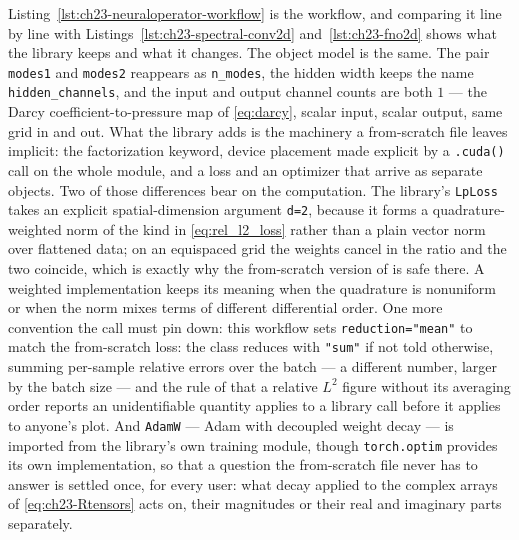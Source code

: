 Listing~\ref{lst:ch23-neuraloperator-workflow} is the workflow, and comparing it
line by line with Listings~\ref{lst:ch23-spectral-conv2d}
and~\ref{lst:ch23-fno2d} shows what the library keeps and what it changes. The
object model is the same. The pair \texttt{modes1} and \texttt{modes2} reappears
as \texttt{n\_modes}, the hidden width keeps the name \texttt{hidden\_channels},
and the input and output channel counts are both $1$ --- the Darcy
coefficient-to-pressure map of \eqref{eq:darcy}, scalar input, scalar output,
same grid in and out. What the library adds is the machinery a from-scratch file
leaves implicit: the factorization keyword, device placement made explicit by a
\texttt{.cuda()} call on the whole module, and a loss and an optimizer that
arrive as separate objects. Two of those differences bear on the computation.
The library's \texttt{LpLoss} takes an
explicit spatial-dimension argument \texttt{d=2}, because it forms a
quadrature-weighted norm of the kind in \eqref{eq:rel_l2_loss} rather than a
plain vector norm over flattened data; on an equispaced grid the weights cancel
in the ratio and the two coincide, which is exactly why the from-scratch version
of  is safe there.
A weighted implementation keeps its meaning when the quadrature is nonuniform
or when the norm mixes terms of different differential order. One more
convention the call must pin down: this workflow sets
\texttt{reduction="mean"} to match the from-scratch loss: the class reduces with
\texttt{"sum"} if not told otherwise, summing per-sample relative errors over
the batch --- a different number, larger by the batch size --- and the rule of
 that a relative
$L^{2}$ figure without its averaging order reports an unidentifiable quantity
applies to a library call before it applies to anyone's plot. And
\texttt{AdamW} --- Adam with decoupled weight decay --- is imported from the library's own training module, though \texttt{torch.optim}
provides its own implementation, so that a question the from-scratch file never has
to answer is settled
once, for every user:
what decay applied to the complex arrays of \eqref{eq:ch23-Rtensors} acts on,
their magnitudes or their real and imaginary parts separately.


